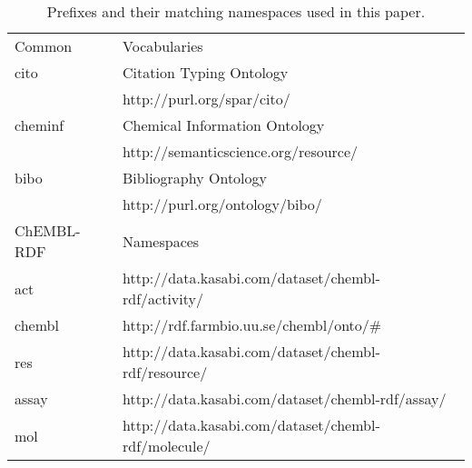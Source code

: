 \documentclass[sw]{iosart2c}
\begin{document}
\begin{table*}
\caption{Prefixes and their matching namespaces used in this paper.} \label{namespaces}
\begin{tabular}{ll}
\hline
Common & Vocabularies \\
cito    & Citation Typing Ontology~\cite{Shotton2010} \\
        & http://purl.org/spar/cito/ \\
cheminf & Chemical Information Ontology~\cite{Hastings2011} \\
        & http://semanticscience.org/resource/ \\
bibo    & Bibliography Ontology~\cite{Giasson2011} \\
        & http://purl.org/ontology/bibo/ \\

\hline
ChEMBL-RDF & Namespaces\\
act    & http://data.kasabi.com/dataset/chembl-rdf/activity/ \\
chembl & http://rdf.farmbio.uu.se/chembl/onto/\# \\
res    & http://data.kasabi.com/dataset/chembl-rdf/resource/ \\
assay  & http://data.kasabi.com/dataset/chembl-rdf/assay/ \\
mol    & http://data.kasabi.com/dataset/chembl-rdf/molecule/ \\
\hline
\end{tabular}
\end{table*}



%
%
%

\end{document}
